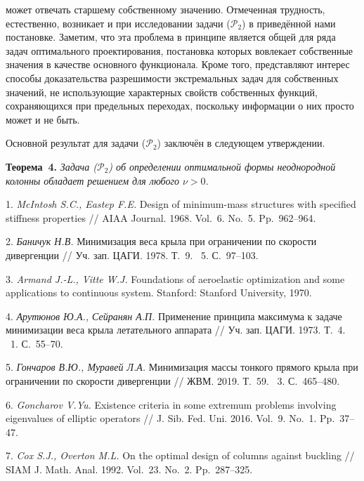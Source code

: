 может отвечать старшему собственному значению.
%
%
%
Отмеченная трудность, естественно, возникает и при исследовании задачи
($\mathcal{P}_2$) в приведённой нами постановке.
%
%
%
Заметим, что эта проблема в принципе является общей для ряда задач оптимального проектирования,
постановка которых вовлекает собственные значения в качестве основного функционала.
%
%
%
Кроме того,
представляют интерес способы доказательства разрешимости
экстремальных задач для собственных значений,
не использующие характерных свойств собственных функций,
сохраняющихся при предельных переходах,
поскольку информации о них просто может и не быть.
%
%
%
%
%
\par
Основной результат для задачи ($\mathcal{P}_2$) заключён в
следующем утверждении.

\textbf{Теорема~4.} {\it Задача \emph{($\mathcal{P}_2$)} об определении оптимальной формы неоднородной колонны обладает решением для любого $\nu > 0$.}
%
%
%
\par



\litlist

1. {\it McIntosh S.C., Eastep F.E.}
Design of minimum-mass structures with specified stiffness properties
// AIAA Journal. 1968. Vol.~6. No.~5. Pp.~962\nobreakdash--964.

2. {\it Баничук Н.В.}
Минимизация веса крыла при ограничении по скорости дивергенции
// Уч. зап. ЦАГИ. 1978. Т.~9. \textnumero~5. С.~97\nobreakdash--103.

3. {\it Armand J.-L., Vitte W.J.}
Foundations of aeroelastic
\linebreak
optimization and some applications to continuous system.
\linebreak
Stanford: Stanford University, 1970.


4. {\it Арутюнов Ю.А., Сейранян А.П.}
Применение принципа максимума к задаче минимизации веса крыла
летательного аппарата
// Уч. зап. ЦАГИ. 1973. Т.~4. \textnumero~1. С.~55\nobreakdash--70.


5. {\it Гончаров В.Ю., Муравей Л.А.}
Минимизация массы тонкого прямого крыла при ограничении по скорости дивергенции
// ЖВМ. 2019. Т.~59. \textnumero~3. С.~465\nobreakdash--480.

6. {\it Goncharov V.Yu.}
Existence criteria in some extremum problems involving eigenvalues of elliptic operators
// J. Sib. Fed. Uni. 2016. Vol.~9. No.~1. Pp.~37\nobreakdash--47.

7. {\it Cox S.J., Overton M.L.}
On the optimal design of columns against buckling
// SIAM J. Math. Anal. 1992. Vol.~23. No.~2. Pp.~287\nobreakdash--325.

